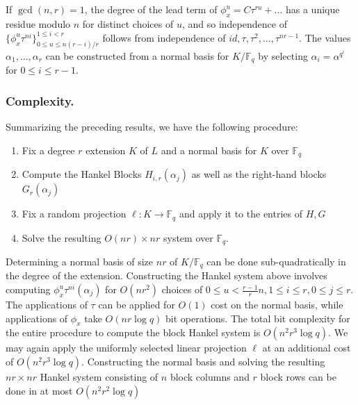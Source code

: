 \documentclass[sigconf]{acmart}
\newcommand{\F}{\mathbb{F}}
\begin{document}
If $\gcd(n,r) = 1$, the degree of the lead term of $\phi_x^u = C\tau^{ru} + \ldots$ has a unique residue modulo $n$ for distinct choices of $u$, and so independence of $\{ \phi_x^{u}\tau^{ni} \}_{0 \leq u \leq n(r-i)/r }^{1 \leq i < r}$ follows from independence of $id, \tau, \tau^2, \ldots, \tau^{nr-1}$. The values $\alpha_1, \ldots, \alpha_r$ can be constructed from a normal basis for $K/\F_q$ by selecting $\alpha_i = \alpha^{q^i}$ for $0 \leq i \leq r - 1$.

\subsubsection{Complexity.} Summarizing the preceding results, we have the following procedure:

\begin{enumerate}
    \item Fix a degree $r$ extension $K$ of $L$ and a normal basis for $K$ over $\F_q$
    \item Compute the Hankel Blocks $H_{i,r}(\alpha_j)$ as well as the right-hand blocks $G_r(\alpha_j)$
    \item Fix a random projection $\ell: K \to \F_q$ and apply it to the entries of $H, G$
    \item Solve the resulting $O(nr) \times nr$ system over $\F_q$.
\end{enumerate}
Determining a normal basis of size $nr$ of $K/\F_q$ can be done sub-quadratically in the degree of the extension. Constructing the Hankel system above involves computing $\phi_x^{u}\tau^{ni}(\alpha_j)$ for $O(nr^2)$ choices of $0 \leq u < \frac{r-1}{r}n, 1 \leq i \leq r, 0 \leq j \leq r$. The applications of $\tau$ can be applied for $O(1)$ cost on the normal basis, while applications of $\phi_x$ take $O(nr \log q)$ bit operations. The total bit complexity for the entire procedure to compute the block Hankel system is $O(n^2r^3\log q)$. We may again apply the uniformly selected linear projection $\ell$ at an additional cost of $O(n^2r^3\log q)$. Constructing the normal basis and solving the resulting $nr \times nr$ Hankel system consisting of $n$ block columns and $r$ block rows can be done in at most $O(n^2r^2\log q)$













\end{document}
